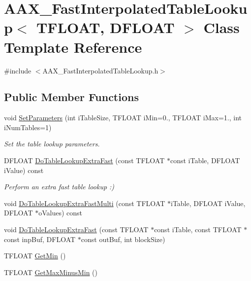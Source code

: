 \hypertarget{a00047}{}\section{A\+A\+X\+\_\+\+Fast\+Interpolated\+Table\+Lookup$<$ T\+F\+L\+O\+A\+T, D\+F\+L\+O\+A\+T $>$ Class Template Reference}
\label{a00047}


{\ttfamily \#include $<$A\+A\+X\+\_\+\+Fast\+Interpolated\+Table\+Lookup.\+h$>$}

\subsection*{Public Member Functions}
\begin{DoxyCompactItemize}
\item 
void \hyperlink{a00047_a74f25a087c55a337d8cdff14c73df7cb}{Set\+Parameters} (int i\+Table\+Size, T\+F\+L\+O\+A\+T i\+Min=0., T\+F\+L\+O\+A\+T i\+Max=1., int i\+Num\+Tables=1)
\begin{DoxyCompactList}\small\item\em Set the table lookup parameters. \end{DoxyCompactList}\item 
D\+F\+L\+O\+A\+T \hyperlink{a00047_a9cf82c7a9b110f02e258707ce27f940c}{Do\+Table\+Lookup\+Extra\+Fast} (const T\+F\+L\+O\+A\+T $\ast$const i\+Table, D\+F\+L\+O\+A\+T i\+Value) const 
\begin{DoxyCompactList}\small\item\em Perform an extra fast table lookup \+:) \end{DoxyCompactList}\item 
void \hyperlink{a00047_a4ead74bb72df82c5fbcb8aae85785c8d}{Do\+Table\+Lookup\+Extra\+Fast\+Multi} (const T\+F\+L\+O\+A\+T $\ast$i\+Table, D\+F\+L\+O\+A\+T i\+Value, D\+F\+L\+O\+A\+T $\ast$o\+Values) const 
\item 
void \hyperlink{a00047_a11b9680510916ee500ced08d3da3fcb2}{Do\+Table\+Lookup\+Extra\+Fast} (const T\+F\+L\+O\+A\+T $\ast$const i\+Table, const T\+F\+L\+O\+A\+T $\ast$const inp\+Buf, D\+F\+L\+O\+A\+T $\ast$const out\+Buf, int block\+Size)
\item 
T\+F\+L\+O\+A\+T \hyperlink{a00047_aabf15d98a86ea76bccbb0eab444bfab5}{Get\+Min} ()
\item 
T\+F\+L\+O\+A\+T \hyperlink{a00047_a7824f358e11c2ee1637f631230a8d967}{Get\+Max\+Minus\+Min} ()
\end{DoxyCompactItemize}


